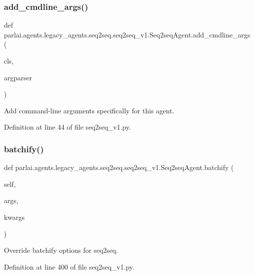 \subsubsection{\texorpdfstring{add\+\_\+cmdline\+\_\+args()}{add\_cmdline\_args()}}
{\footnotesize\ttfamily def parlai.\+agents.\+legacy\+\_\+agents.\+seq2seq.\+seq2seq\+\_\+v1.\+Seq2seq\+Agent.\+add\+\_\+cmdline\+\_\+args (\begin{DoxyParamCaption}\item[{}]{cls,  }\item[{}]{argparser }\end{DoxyParamCaption})}

\begin{DoxyVerb}Add command-line arguments specifically for this agent.\end{DoxyVerb}
 

Definition at line 44 of file seq2seq\+\_\+v1.\+py.

\mbox{\label{classparlai_1_1agents_1_1legacy__agents_1_1seq2seq_1_1seq2seq__v1_1_1Seq2seqAgent_abb81dee41215c5d402fef970b0bf1931}} 
\subsubsection{\texorpdfstring{batchify()}{batchify()}}
{\footnotesize\ttfamily def parlai.\+agents.\+legacy\+\_\+agents.\+seq2seq.\+seq2seq\+\_\+v1.\+Seq2seq\+Agent.\+batchify (\begin{DoxyParamCaption}\item[{}]{self,  }\item[{}]{args,  }\item[{}]{kwargs }\end{DoxyParamCaption})}

\begin{DoxyVerb}Override batchify options for seq2seq.\end{DoxyVerb}
 

Definition at line 400 of file seq2seq\+\_\+v1.\+py.



